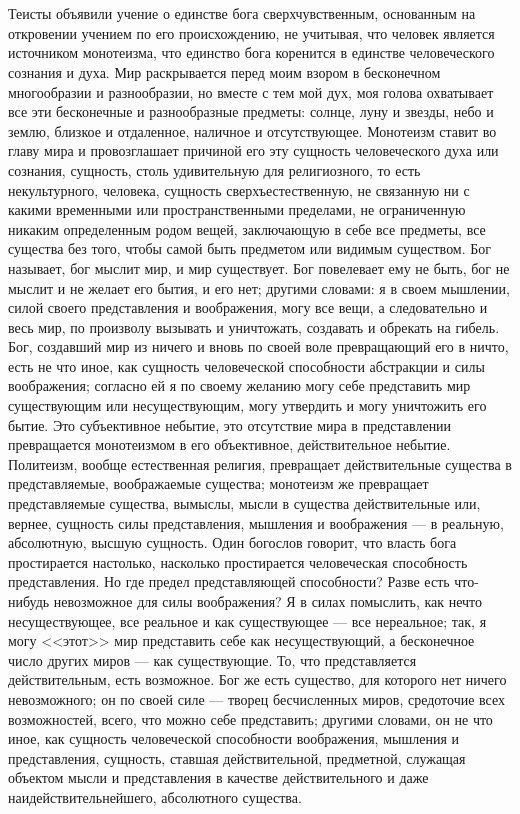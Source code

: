 \documentclass[12pt,oneside]{book}
\begin{document}
\chapter{}

Теисты объявили учение о единстве бога сверхчувственным, основанным на откровении учением по его происхождению, не учитывая, что человек является источником монотеизма, что единство бога коренится в единстве человеческого сознания и духа. Мир раскрывается перед моим взором в бесконечном многообразии и разнообразии, но вместе с тем мой дух, моя голова охватывает все эти бесконечные и разнообразные предметы: солнце, луну и звезды, небо и землю, близкое и отдаленное, наличное и отсутствующее. Монотеизм ставит во главу мира и провозглашает причиной его эту сущность человеческого духа или сознания, сущность, столь удивительную для религиозного, то есть некультурного, человека, сущность сверхъестественную, не связанную ни с какими временными или пространственными пределами, не ограниченную никаким определенным родом вещей, заключающую в себе все предметы, все существа без того, чтобы самой быть предметом или видимым существом. Бог называет, бог мыслит мир, и мир существует. Бог повелевает ему не быть, бог не мыслит и не желает его бытия, и его нет; другими словами: я в своем мышлении, силой своего представления и воображения, могу все вещи, а следовательно и весь мир, по произволу вызывать и уничтожать, создавать и обрекать на гибель. Бог, создавший мир из ничего и вновь по своей воле превращающий его в ничто, есть не что иное, как сущность человеческой способности абстракции и силы воображения; согласно ей я по своему желанию могу себе представить мир существующим или несуществующим, могу утвердить и могу уничтожить его бытие. Это субъективное небытие, это отсутствие мира в представлении превращается монотеизмом в его объективное, действительное небытие. Политеизм, вообще естественная религия, превращает действительные существа в представляемые, воображаемые существа; монотеизм же превращает представляемые существа, вымыслы, мысли в существа действительные или, вернее, сущность силы представления, мышления и воображения --- в реальную, абсолютную, высшую сущность. Один богослов говорит, что власть бога простирается настолько, насколько простирается человеческая способность представления. Но где предел представляющей способности? Разве есть что-нибудь невозможное для силы воображения? Я в силах помыслить, как нечто несуществующее, все реальное и как существующее --- все нереальное; так, я могу <<этот>> мир представить себе как несуществующий, а бесконечное число других миров --- как существующие. То, что представляется действительным, есть возможное. Бог же есть существо, для которого нет ничего невозможного; он по своей силе --- творец бесчисленных миров, средоточие всех возможностей, всего, что можно себе представить; другими словами, он не что иное, как сущность человеческой способности воображения, мышления и представления, сущность, ставшая действительной, предметной, служащая объектом мысли и представления в качестве действительного и даже наидействительнейшего, абсолютного существа.
\end{document}
